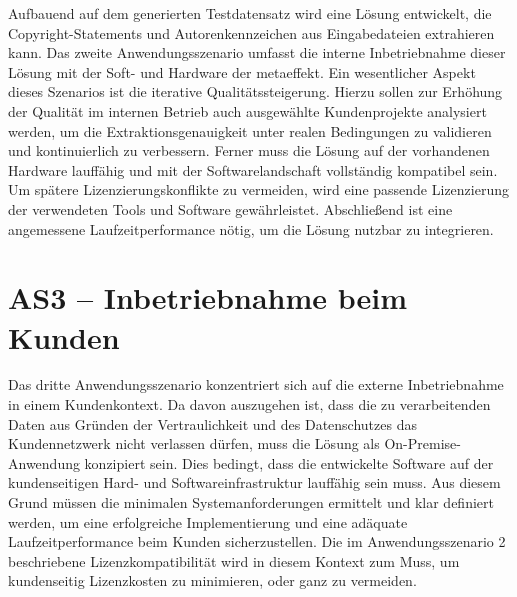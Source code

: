 Aufbauend auf dem generierten Testdatensatz wird eine Lösung entwickelt, die Copyright-Statements und Autorenkennzeichen aus Eingabedateien extrahieren kann.
Das zweite Anwendungsszenario umfasst die interne Inbetriebnahme dieser Lösung mit der Soft- und Hardware der metaeffekt.
Ein wesentlicher Aspekt dieses Szenarios ist die iterative Qualitätssteigerung.
Hierzu sollen zur Erhöhung der Qualität im internen Betrieb auch ausgewählte Kundenprojekte analysiert werden, um die Extraktionsgenauigkeit unter realen Bedingungen zu validieren und kontinuierlich zu verbessern.
Ferner muss die Lösung auf der vorhandenen Hardware lauffähig und mit der Softwarelandschaft vollständig kompatibel sein.
Um spätere Lizenzierungskonflikte zu vermeiden, wird eine passende Lizenzierung der verwendeten Tools und Software gewährleistet.
Abschließend ist eine angemessene Laufzeitperformance nötig, um die Lösung nutzbar zu integrieren.


\section{AS3 -- Inbetriebnahme beim Kunden}\label{sec:anwendungsszenario-3}

Das dritte Anwendungsszenario konzentriert sich auf die externe Inbetriebnahme in einem Kundenkontext.
Da davon auszugehen ist, dass die zu verarbeitenden Daten aus Gründen der Vertraulichkeit und des Datenschutzes das Kundennetzwerk nicht verlassen dürfen, muss die Lösung als On-Premise-Anwendung konzipiert sein.
Dies bedingt, dass die entwickelte Software auf der kundenseitigen Hard- und Softwareinfrastruktur lauffähig sein muss.
Aus diesem Grund müssen die minimalen Systemanforderungen ermittelt und klar definiert werden, um eine erfolgreiche Implementierung und eine adäquate Laufzeitperformance beim Kunden sicherzustellen.
Die im Anwendungsszenario 2 beschriebene Lizenzkompatibilität wird in diesem Kontext zum Muss, um kundenseitig Lizenzkosten zu minimieren, oder ganz zu vermeiden.
